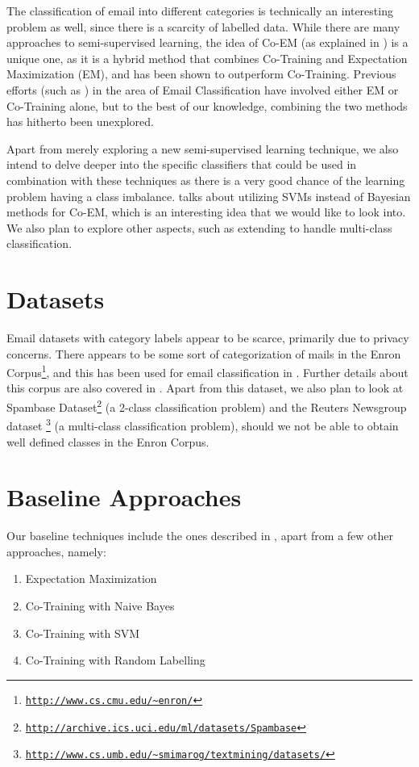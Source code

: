 The classification of email into different categories is technically an interesting problem as well, since there is a scarcity of labelled data. While there are many approaches to semi-supervised learning, the idea of Co-EM (as explained in \cite{duck}) is a unique one, as it is a hybrid method that combines Co-Training and Expectation Maximization (EM), and has been shown to outperform Co-Training. Previous efforts (such as \cite{dog}) in the area of Email Classification have involved either EM or Co-Training alone, but to the best of our knowledge, combining the two methods has hitherto been unexplored.

Apart from merely exploring a new semi-supervised learning technique, we also intend to delve deeper into the specific classifiers that could be used in combination with these techniques as there is a very good chance of the learning problem having a class imbalance. \cite{coemsvl} talks about utilizing SVMs instead of Bayesian methods for Co-EM, which is an interesting idea that we would like to look into. We also plan to explore other aspects, such as extending \cite{dog} to handle multi-class classification.

\section{Datasets}
Email datasets with category labels appear to be scarce, primarily due to privacy concerns. There appears to be some sort of categorization of mails in the Enron Corpus\footnote{\texttt{\url{http://www.cs.cmu.edu/~enron/}}}, and this has been used for email classification in \cite{enronclass}. Further details about this corpus are also covered in \cite{enron}. Apart from this dataset, we also plan to look at Spambase Dataset\footnote{\texttt{\url{http://archive.ics.uci.edu/ml/datasets/Spambase}}} (a 2-class classification problem) and the Reuters Newsgroup dataset \footnote{\texttt{\url{http://www.cs.umb.edu/~smimarog/textmining/datasets/}}} (a multi-class classification problem), should we not be able to obtain well defined classes in the Enron Corpus.

\section{Baseline Approaches}

Our baseline techniques include the ones described in \cite{duck}, apart from a few other approaches, namely:

\begin{enumerate}
\item 
    Expectation Maximization
\item
    Co-Training with Naive Bayes
\item
    Co-Training with SVM
\item
    Co-Training with  Random Labelling
\end{enumerate}

